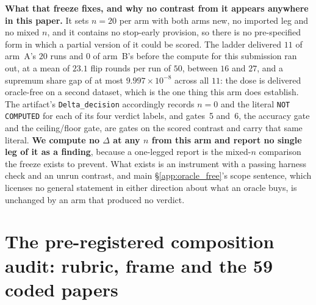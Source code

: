 \documentclass{article}
\begin{document}
\textbf{What that freeze fixes, and why no contrast from it appears anywhere in this paper.} It sets
$n=20$ per arm with both arms new, no imported leg and no mixed $n$, and it contains no stop-early
provision, so there is no pre-specified form in which a partial version of it could be scored. The
ladder delivered $11$ of arm~A's $20$ runs and $0$ of arm~B's before the compute for this submission
ran out, at a mean of $23.1$ flip rounds per run of $50$, between $16$ and $27$, and a supremum share
gap of at most $9.997{\times}10^{-8}$ across all $11$: the dose is delivered oracle-free on a second
dataset, which is the one thing this arm does establish. The artifact's \texttt{Delta\_decision}
accordingly records $n=0$ and the literal \texttt{NOT COMPUTED} for each of its four verdict labels,
and gates~5 and~6, the accuracy gate and the ceiling/floor gate, are gates on the scored contrast and
carry that same literal. \textbf{We compute no $\Delta$ at any $n$ from this arm and report no single
leg of it as a finding}, because a one-legged report is the mixed-$n$ comparison the freeze exists to
prevent. What exists is an instrument with a passing harness check and an unrun contrast, and main
§\ref{app:oracle_free}'s scope sentence, which licenses no general statement in either direction about
what an oracle buys, is unchanged by an arm that produced no verdict.


\section{The pre-registered composition audit: rubric, frame and the 59 coded papers}
\label{app:audit}
\end{document}
